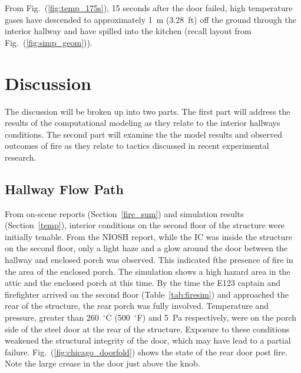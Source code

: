 \documentclass[11pt,oneside]{book}
\begin{document}
From Fig.~(\ref{fig:temp_175s}), 15 seconds after the door failed, high temperature gases have descended to approximately 1~m (3.28~ft) off the ground through the interior hallway and have spilled into the kitchen (recall layout from Fig.~(\ref{fig:simp_geom})).


\chapter{Discussion}
The discussion will be broken up into two parts. The first part will address the results of the computational modeling as they relate to the interior hallways conditions. The second part will examine the the model results and observed outcomes of fire as they relate to tactics discussed in recent experimental research. 

\section{Hallway Flow Path}
From on-scene reports (Section~\ref{fire_sum}) and simulation results (Section~\ref{temp}), interior conditions on the second floor of the structure were initially tenable. From the NIOSH report, while the IC was inside the structure on the second floor, only a light haze and a glow around the door between the hallway and enclosed porch was observed. This indicated fthe presence of fire in the area of the enclosed porch. The simulation shows a high hazard area in the attic and the enclosed porch at this time. By the time the E123 captain and firefighter arrived on the second floor (Table~\ref{tab:firesim}) and approached the rear of the structure, the rear porch was fully involved. Temperature and pressure, greater than 260~$^{\circ}$C (500~$^{\circ}$F) and 5~Pa respectively, were on the porch side of the steel door at the rear of the structure. Exposure to these conditions weakened the structural integrity of the door, which may have lead to a partial failure. Fig.~(\ref{fig:chicago_doorfold}) shows the state of the rear door post fire. Note the large crease in the door just above the knob.
\end{document}
